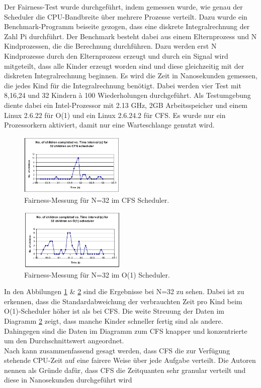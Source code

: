 Der Fairness-Test wurde durchgeführt, indem gemessen wurde, wie genau der Scheduler die CPU-Bandbreite über mehrere Prozesse verteilt. Dazu wurde ein Benchmark-Programm beiseite gezogen, dass eine diskrete Integralrechnung der Zahl Pi durchführt. Der Benchmark besteht dabei aus einem Elternprozess und N Kindprozessen, die die Berechnung durchführen. Dazu werden erst N Kindprozesse durch den Elternprozess erzeugt und durch ein Signal wird mitgeteilt, dass alle Kinder erzeugt worden sind und diese gleichzeitig mit der diskreten Integralrechnung beginnen. Es wird die Zeit in Nanosekunden gemessen, die jedes Kind für die Integralrechnung benötigt. Dabei werden vier Test mit 8,16,24 und 32 Kindern à 100 Wiederholungen durchgeführt. Als Testumgebung diente dabei ein Intel-Prozessor mit 2.13 GHz, 2GB Arbeitsspeicher und einem Linux 2.6.22 für O(1) und ein Linux 2.6.24.2 für CFS. Es wurde nur ein Prozessorkern aktiviert, damit nur eine Warteschlange genutzt wird.  
\begin{figure} [h]
	\centering
	\includegraphics[width=0.45\textwidth]{pictures/fairness_32_cfs.png}
	\caption{Fairness-Messung für N=32 im CFS Scheduler.}
	\label{fig:fair_meas_cfs}
\end{figure}
\begin{figure} [h]
 	\centering
 	\includegraphics[width=0.45\textwidth]{pictures/fairness_32_O1.png}
 	\caption{Fairness-Messung für N=32 im O(1) Scheduler.}
 	\label{fig:fair_meas_o1}
\end{figure}

In den Abbilungen \ref{fig:fair_meas_cfs} \& \ref{fig:fair_meas_o1} sind die Ergebnisse bei N=32 zu sehen. Dabei ist zu erkennen, dass die Standardabweichung der verbrauchten Zeit pro Kind beim O(1)-Scheduler höher ist als bei CFS. Die weite Streuung der Daten im Diagramm \ref{fig:fair_meas_o1} zeigt, dass manche Kinder schneller fertig sind als andere. Dahingegen sind die Daten im Diagramm zum CFS knapper und konzentrierte um den Durchschnittswert angeordnet. \\
Nach \cite{papercomparison} kann zusammenfassend gesagt werden, dass CFS die zur Verfügung stehende CPU-Zeit auf eine fairere Weise über jede Aufgabe verteilt. Die Autoren nennen als Gründe dafür, dass CFS die Zeitquanten sehr granular verteilt und diese in Nanosekunden durchgeführt wird

